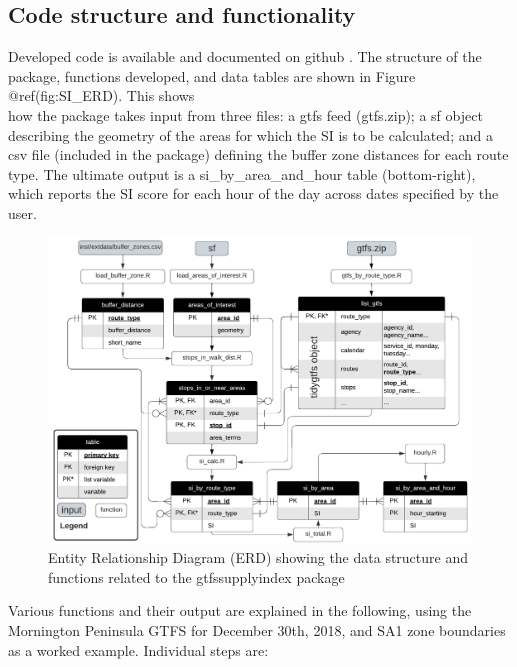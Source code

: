 \documentclass[preprint, 3p,
authoryear]{elsarticle} %
\begin{document}
\hypertarget{code-structure-and-functionality}{%
\subsection{Code structure and
functionality}\label{code-structure-and-functionality}}

Developed code is available and documented on github
\citep{gtfssupplyindex_github}. The structure of the package, functions
developed, and data tables are shown in Figure @ref(fig:SI\_ERD). This
shows\\
how the package takes input from three files: a gtfs feed (gtfs.zip); a
sf object describing the geometry of the areas for which the SI is to be
calculated; and a csv file (included in the package) defining the buffer
zone distances for each route type. The ultimate output is a
si\_by\_area\_and\_hour table (bottom-right), which reports the SI score
for each hour of the day across dates specified by the user.

\begin{figure}
\includegraphics[width=1\linewidth]{graphics/SI_data_structure} \caption{Entity Relationship Diagram (ERD) showing the data structure and functions related to the gtfssupplyindex package}\label{fig:SI_ERD}
\end{figure}

Various functions and their output are explained in the following, using
the Mornington Peninsula GTFS for December 30th, 2018, and SA1 zone
boundaries as a worked example. Individual steps are:
\end{document}
